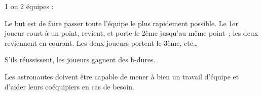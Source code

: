 \documentclass{grand-jeu}
\begin{document}
\begin{regles}
1 ou 2 équipes :

Le but est de faire passer toute l’équipe le plus rapidement possible. 
Le 1er joueur court à un point, revient, et porte le 2ème jusqu’au même point ; les deux reviennent en courant. Les deux joueurs portent le 3ème, etc…

S’ils réussissent, les joueurs gagnent des b-dures. 
\end{regles}

\begin{imaginaire}
Les astronautes doivent être capable de mener à bien un travail d'équipe et d'aider leurs coéquipiers en cas de besoin. 
\end{imaginaire}

\begin{moments-stop}
\end{moments-stop}
\end{document}
